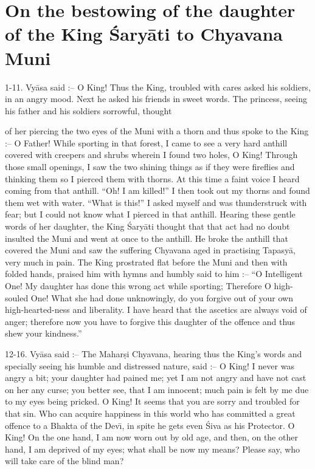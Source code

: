 \chapter{On the bestowing of the daughter of the King \'Sary\=ati to Chyavana Muni}

1-11. Vy\=asa said :-- O King! Thus the King, troubled with cares asked his soldiers, in an angry mood. Next he asked his friends in sweet words. The princess, seeing his father and his soldiers sorrowful, thought

of her piercing the two eyes of the Muni with a thorn and thus spoke to the King :-- O Father! While sporting in that forest, I came to see a very hard anthill covered with creepers and shrubs wherein I found two holes, O King! Through those small openings, I saw the two shining things as if they were fireflies and thinking them so I pierced them with thorns. At this time a faint voice I heard coming from that anthill. ``Oh! I am killed!'' I then took out my thorns and found them wet with water. ``What is this!'' I asked myself and was thunderstruck with fear; but I could not know what I pierced in that anthill. Hearing these gentle words of her daughter, the King \'Sary\=ati thought that that act had no doubt insulted the Muni and went at once to the anthill. He broke the anthill that covered the Muni and saw the suffering Chyavana aged in practising Tapasy\=a, very much in pain. The King prostrated flat before the Muni and then with folded hands, praised him with hymns and humbly said to him :-- ``O Intelligent One! My daughter has done this wrong act while sporting; Therefore O high-souled One! What she had done unknowingly, do you forgive out of your own high-hearted-ness and liberality. I have heard that the ascetics are always void of anger; therefore now you have to forgive this daughter of the offence and thus shew your kindness.''

12-16. Vy\=asa said :-- The Mahar\d{s}i Chyavana, hearing thus the King's words and specially seeing his humble and distressed nature, said :-- O King! I never was angry a bit; your daughter had pained me; yet I am not angry and have not cast on her any curse; you better see, that I am innocent; much pain is felt by me due to my eyes being pricked. O King! It seems that you are sorry and troubled for that sin. Who can acquire happiness in this world who has committed a great offence to a Bhakta of the Dev\={\i}, in spite he gets even \'Siva as his Protector. O King! On the one hand, I am now worn out by old age, and then, on the other hand, I am deprived of my eyes; what shall be now my means? Please say, who will take care of the blind man?

